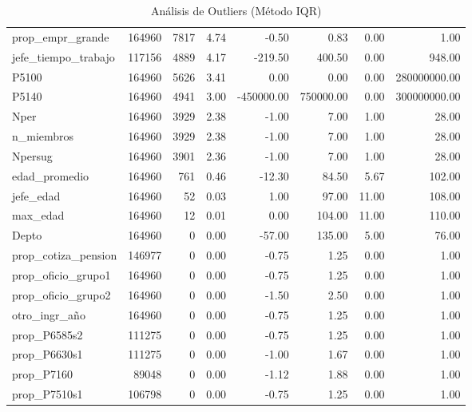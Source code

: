 \begin{table}[ht]
\begin{tabular}{lrrrrrrr}
  prop\_empr\_grande & 164960 & 7817 & 4.74 & -0.50 & 0.83 & 0.00 & 1.00 \\ 
  jefe\_tiempo\_trabajo & 117156 & 4889 & 4.17 & -219.50 & 400.50 & 0.00 & 948.00 \\ 
  P5100 & 164960 & 5626 & 3.41 & 0.00 & 0.00 & 0.00 & 280000000.00 \\ 
  P5140 & 164960 & 4941 & 3.00 & -450000.00 & 750000.00 & 0.00 & 300000000.00 \\ 
  Nper & 164960 & 3929 & 2.38 & -1.00 & 7.00 & 1.00 & 28.00 \\ 
  n\_miembros & 164960 & 3929 & 2.38 & -1.00 & 7.00 & 1.00 & 28.00 \\ 
  Npersug & 164960 & 3901 & 2.36 & -1.00 & 7.00 & 1.00 & 28.00 \\ 
  edad\_promedio & 164960 & 761 & 0.46 & -12.30 & 84.50 & 5.67 & 102.00 \\ 
  jefe\_edad & 164960 &  52 & 0.03 & 1.00 & 97.00 & 11.00 & 108.00 \\ 
  max\_edad & 164960 &  12 & 0.01 & 0.00 & 104.00 & 11.00 & 110.00 \\ 
  Depto & 164960 &   0 & 0.00 & -57.00 & 135.00 & 5.00 & 76.00 \\ 
  prop\_cotiza\_pension & 146977 &   0 & 0.00 & -0.75 & 1.25 & 0.00 & 1.00 \\ 
  prop\_oficio\_grupo1 & 164960 &   0 & 0.00 & -0.75 & 1.25 & 0.00 & 1.00 \\ 
  prop\_oficio\_grupo2 & 164960 &   0 & 0.00 & -1.50 & 2.50 & 0.00 & 1.00 \\ 
  otro\_ingr\_año & 164960 &   0 & 0.00 & -0.75 & 1.25 & 0.00 & 1.00 \\ 
  prop\_P6585s2 & 111275 &   0 & 0.00 & -0.75 & 1.25 & 0.00 & 1.00 \\ 
  prop\_P6630s1 & 111275 &   0 & 0.00 & -1.00 & 1.67 & 0.00 & 1.00 \\ 
  prop\_P7160 & 89048 &   0 & 0.00 & -1.12 & 1.88 & 0.00 & 1.00 \\ 
  prop\_P7510s1 & 106798 &   0 & 0.00 & -0.75 & 1.25 & 0.00 & 1.00 \\ 
   \bottomrule
\end{tabular}
\caption{Análisis de Outliers (Método IQR)} 
\label{tab:outliers}
\end{table}
